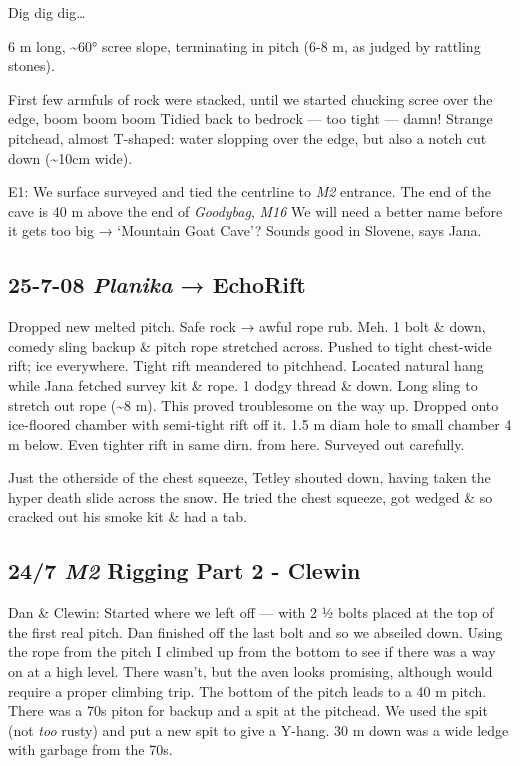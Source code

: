 Dig dig dig\ldots{}

6 m long, \textasciitilde 60° scree slope, terminating in pitch (6-8 m,
as judged by rattling stones).

First few armfuls of rock were stacked, until we started chucking scree
over the edge, boom boom boom Tidied back to bedrock --- too tight ---
damn! Strange pitchead, almost T-shaped: water slopping over the edge,
but also a notch cut down (\textasciitilde{}10cm wide).

E1: We surface surveyed and tied the centrline to \emph{M2} entrance.
The end of the cave is 40 m above the end of \emph{Goodybag}, \emph{M16}
We will need a better name before it gets too big → `Mountain Goat
Cave'? Sounds good in Slovene, says Jana.


\hypertarget{planika-echorift}{%
\subsection{\texorpdfstring{25-7-08 \emph{Planika} →
EchoRift}{25-7-08 Planika → EchoRift}}\label{planika-echorift}}

Dropped new melted pitch. Safe rock → awful rope rub. Meh. 1 bolt \&
down, comedy sling backup \& pitch rope stretched across. Pushed to
tight chest-wide rift; ice everywhere. Tight rift meandered to
pitchhead. Located natural hang while Jana fetched survey kit \& rope. 1
dodgy thread \& down. Long sling to stretch out rope (\textasciitilde{}8
m). This proved troublesome on the way up. Dropped onto ice-floored
chamber with semi-tight rift off it. 1.5 m diam hole to small chamber 4
m below. Even tighter rift in same dirn. from here. Surveyed out
carefully.

Just the otherside of the chest squeeze, Tetley shouted down, having
taken the hyper death slide across the snow. He tried the chest squeeze,
got wedged \& so cracked out his smoke kit \& had a tab.

\hypertarget{m2-rigging-part-2---clewin}{%
\subsection{\texorpdfstring{24/7 \emph{M2} Rigging Part 2 -
Clewin}{24/7 M2 Rigging Part 2 - Clewin}}\label{m2-rigging-part-2---clewin}}

Dan \& Clewin: Started where we left off --- with 2 ½ bolts placed at
the top of the first real pitch. Dan finished off the last bolt and so
we abseiled down. Using the rope from the pitch I climbed up from the
bottom to see if there was a way on at a high level. There wasn't, but
the aven looks promising, although would require a proper climbing trip.
The bottom of the pitch leads to a 40 m pitch. There was a 70s piton for
backup and a spit at the pitchead. We used the spit (not \emph{too}
rusty) and put a new spit to give a Y-hang. 30 m down was a wide ledge
with garbage from the 70s.

